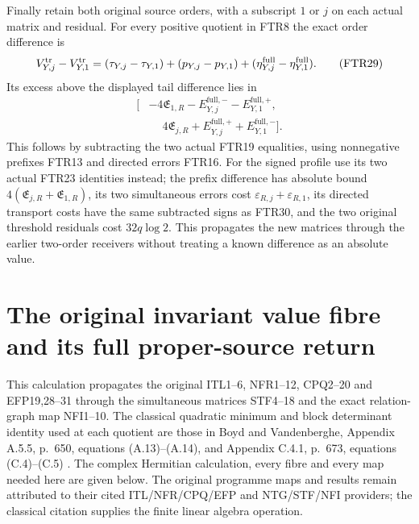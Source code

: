 Finally retain both original source orders, with a subscript $1$
or $j$ on each actual matrix and residual. For every positive
quotient in FTR8 the exact order difference is
\[
 V_{Y,j}^{\rm tr}-V_{Y,1}^{\rm tr}
 =(\tau_{Y,j}-\tau_{Y,1})+(p_{Y,j}-p_{Y,1})
                  +(\eta_{Y,j}^{\rm full}-\eta_{Y,1}^{\rm full}).
                                                               \tag{FTR29}
\]
Its excess above the displayed tail difference lies in
\[
\begin{split}
 [&-4\mathfrak E_{1,R}-E_{Y,j}^{\mathrm{full},-}
                             -E_{Y,1}^{\mathrm{full},+},\\
  &\phantom{-}4\mathfrak E_{j,R}+E_{Y,j}^{\mathrm{full},+}
                             +E_{Y,1}^{\mathrm{full},-}].        \tag{FTR30}
\end{split}
\]
This follows by subtracting the two actual FTR19 equalities,
using nonnegative prefixes FTR13 and directed errors FTR16.
For the signed profile use its two actual FTR23 identities instead;
the prefix difference has absolute bound
$4(\mathfrak E_{j,R}+\mathfrak E_{1,R})$, its two simultaneous
errors cost $\varepsilon_{R,j}+\varepsilon_{R,1}$, its directed
transport costs have the same subtracted signs as FTR30, and
the two original threshold residuals cost $32q\log2$.
This propagates the new matrices through the earlier two-order
receivers without treating a known difference as an absolute value.

\endgroup

\begingroup
\section{The original invariant value fibre and its full proper-source return}
\label{sec:PRD}

This calculation propagates the original ITL1--6, NFR1--12,
CPQ2--20 and EFP19,28--31 through the simultaneous matrices
STF4--18 and the exact relation-graph map NFI1--10. The classical
quadratic minimum and block determinant identity used at each quotient
are those in Boyd and Vandenberghe, Appendix A.5.5, p.~650,
equations (A.13)--(A.14), and Appendix C.4.1, p.~673,
equations (C.4)--(C.5) \cite{human:boyd-vandenberghe}.
The complex Hermitian calculation, every fibre and every map needed
here are given below. The original programme maps and results remain
attributed to their cited ITL/NFR/CPQ/EFP and NTG/STF/NFI providers;
the classical citation supplies the finite linear algebra operation.

